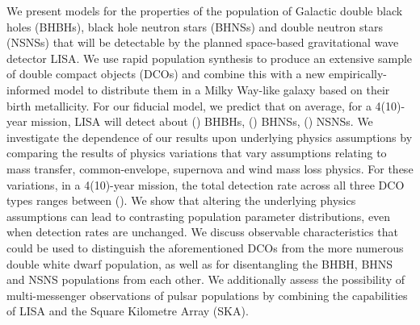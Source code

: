 We present models for the properties of the population of Galactic double black holes (BHBHs), black hole neutron stars (BHNSs) and double neutron stars (NSNSs) that will be detectable by the planned space-based gravitational wave detector LISA. We use rapid population synthesis to produce an extensive sample of double compact objects (DCOs) and combine this with a new empirically-informed model to distribute them in a Milky Way-like galaxy based on their birth metallicity. For our fiducial model, we predict that on average, for a 4(10)-year mission, LISA will detect about \BHBHFourYear{}(\BHBHTenYear{}) BHBHs, \BHNSFourYear{}(\BHNSTenYear{}) BHNSs, \NSNSFourYear{}(\NSNSTenYear{}) NSNSs. We investigate the dependence of our results upon underlying physics assumptions by comparing the results of \nModels{} physics variations that vary assumptions relating to mass transfer, common-envelope, supernova and wind mass loss physics. For these variations, in a 4(10)-year mission, the total detection rate across all three DCO types ranges between \rangeFourYear{}(\rangeTenYear{}).
We show that altering the underlying physics assumptions can lead to contrasting population parameter distributions, even when detection rates are unchanged. We discuss observable characteristics that could be used to distinguish the aforementioned DCOs from the more numerous double white dwarf population, as well as for disentangling the BHBH, BHNS and NSNS populations from each other. We additionally assess the possibility of multi-messenger observations of pulsar populations by combining the capabilities of LISA and the Square Kilometre Array (SKA).